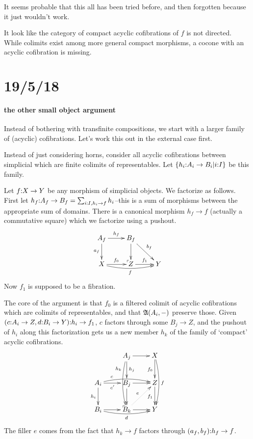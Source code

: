 \documentclass[csh.tex]{subfiles}
\makeatletter
\newcommand\pushout{\ar@{}[dr]|(.9)\ulcorner}
\makeatother
\begin{document}
It seems probable that this all has been tried before, and then forgotten because it just wouldn't work. 

It look like the category of compact acyclic cofibrations of $f$ is not directed. While colimits exist among more general compact morphisms, a cocone with an acyclic cofibration is missing. 


\section{19/5/18}

\paragraph{the other small object argument}
Instead of bothering with transfinite compositions, we start with a larger family of (acyclic) cofibrations. Let's work this out in the external case first.

Instead of just considering horns, consider all acyclic cofibrations between simplicial which are finite colimits of representables. Let $\left\{h_i\mathord : A_i \to B_i |i\mathord : I\right\}$ be this family.

Let $f\mathord : X\to Y$ be any morphism of simplicial objects. We factorize as follows. First let $h_f\mathord : A_f\to B_f = \sum_{ i\mathord : I, h_i\to f } h_i$--this is a sum of morphisms between the appropriate sum of domains. There is a canonical morphism $h_f\to f$ (actually a commutative square) which we factorize using a pushout.
\[\xymatrix{
A_f\ar[r]^{h_f}\ar[d]_{a_f}\pushout & B_f\ar[d]\ar[dr]^{b_f} \\
X \ar[r]^{f_0}\ar@/_/[rr]_f & Z \ar[r]^{f_1} & Y
}\]
Now $f_1$ is supposed to be a fibration.

The core of the argument is that $f_0$ is a filtered colimit of acyclic cofibrations which are colimits of representables, and that $\mathfrak A(A_i,-)$ preserve those. Given $(c\mathord : A_i\to Z,d\mathord : B_i\to Y)\mathord : h_i\to f_1$, $c$ factors through some $B_j\to Z$, and the pushout of $h_i$ along this factorization gets us a new member $h_k$ of the family of `compact' acyclic cofibrations.
\[ \xymatrix{
 & A_j\ar@/_/[dd]_(.25){h_k}\ar[d]^{h_j} \ar[r] & X\ar[d]_{f_0} \ar@/^/[dd]^f\\
A_i \ar[d]_{h_i} \ar[r]_{c'} \ar@/^/[rr]^(.25)c \pushout & B_j \ar[r]\ar[d] &Z\ar[d]_{f_1}\\
B_i \ar[r]\ar@/_/[rr]_{d} & B_k\ar[r]\ar@{.>}[ur]^e & Y
}\]
The filler $e$ comes from the fact that $h_k\to f$ factors through $(a_f,b_f)\mathord : h_f\to f$.
\end{document}
